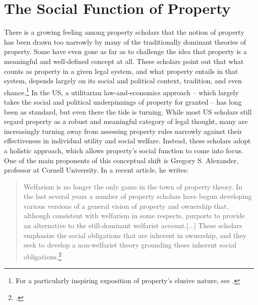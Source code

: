 \section{The Social Function of Property}\label{sec:socfunc}

There is a growing feeling among property scholars that the notion of property has been drawn too narrowly by many of the traditionally dominant theories of property. Some have even gone as far as to challenge the idea that property is a meaningful and well-defined concept at all. These scholars point out that what counts as property in a given legal system, and what property entails in that system, depends largely on its social and political context, tradition, and even chance.\footnote{For a particularly inspiring exposition of property's elusive nature, see \cite{gray91}.} In the US, a utilitarian law-and-economics approach -- which largely takes the social and political underpinnings of property for granted -- has long been  as standard, but even there the tide is turning. While most US scholars still regard property as a robust and meaningful category of legal thought, many are increasingly turning away from assessing property rules narrowly against their effectiveness in  individual utility and social welfare. Instead, these scholars adopt a holistic approach, which allows property's social function to come into focus. One of the main proponents of this conceptual shift is Gregory S. Alexander, professor at Cornell University. In a recent article, he writes:

\begin{quote} Welfarism is no longer the only game in the town of property theory. In the last several years a number of property scholars have begun developing various versions of a general vision of property and ownership that, although consistent with welfarism in some respects, purports to provide an alternative to the still-dominant welfarist account.[...] These scholars emphasize the social obligations that are inherent in ownership, and they seek to develop a non-welfarist theory grounding those inherent social obligations.\footcite[1017]{alexander11}
\end{quote}

